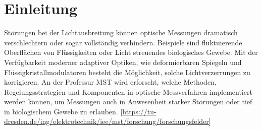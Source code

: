 
\chapter{Einleitung}


Störungen bei der Lichtausbreitung können optische Messungen dramatisch verschlechtern oder sogar vollständig verhindern. Beispiele sind fluktuierende Oberflächen von Flüssigkeiten oder Licht streuendes biologisches Gewebe. Mit der Verfügbarkeit moderner adaptiver Optiken, wie deformierbaren Spiegeln und Flüssigkristallmodulatoren besteht die Möglichkeit, solche Lichtverzerrungen zu korrigieren. An der Professur MST wird erforscht, welche Methoden, Regelungsstrategien und Komponenten in optische Messverfahren implementiert werden können, um Messungen auch in Anwesenheit starker Störungen oder tief in biologischem Gewebe zu erlauben. [\url{https://tu-dresden.de/ing/elektrotechnik/iee/mst/forschung/forschungsfelder}]
